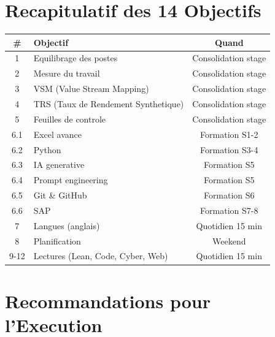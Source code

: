 \documentclass[12pt,a4paper]{article}
\begin{document}
\newpage

\section{Recapitulatif des 14 Objectifs}

\begin{table}[h]
\centering
\begin{tabular}{|c|l|c|}
\hline
\rowcolor{gray!20}
\textbf{\#} & \textbf{Objectif} & \textbf{Quand} \\
\hline
1 & Equilibrage des postes & Consolidation stage \\
2 & Mesure du travail & Consolidation stage \\
3 & VSM (Value Stream Mapping) & Consolidation stage \\
4 & TRS (Taux de Rendement Synthetique) & Consolidation stage \\
5 & Feuilles de controle & Consolidation stage \\
6.1 & Excel avance & Formation S1-2 \\
6.2 & Python & Formation S3-4 \\
6.3 & IA generative & Formation S5 \\
6.4 & Prompt engineering & Formation S5 \\
6.5 & Git \& GitHub & Formation S6 \\
6.6 & SAP & Formation S7-8 \\
7 & Langues (anglais) & Quotidien 15 min \\
8 & Planification & Weekend \\
9-12 & Lectures (Lean, Code, Cyber, Web) & Quotidien 15 min \\
\hline
\end{tabular}
\end{table}

\newpage

\section{Recommandations pour l'Execution}
\end{document}
